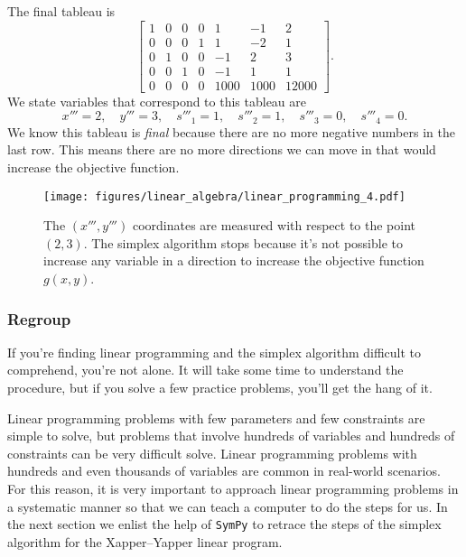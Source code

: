 \documentclass[11pt,oneside]{article}
\begin{document}
		\noindent
		The final tableau is
		\[
		\left[
		\begin{array}{rrrrrr|r}
		1& 0& 0& 0&    1&   -1&     2      \\ 
		0& 0& 0& 1&    1&   -2&     1      \\ 
		0& 1& 0& 0&   -1&    2&     3      \\ 
		0& 0& 1& 0&   -1&    1&     1      \\ 
		0& 0& 0& 0& 1000& 1000& 12000      
		\end{array}
		\right].
		\]
		We state variables that correspond to this tableau are
		\[
			x'''=2, \quad y'''=3, \quad s'''_1=1, \quad s'''_2=1,  \quad s'''_3=0, \quad s'''_4=0.
		\]	
		We know this tableau is \emph{final} because there are no more negative numbers in the last row.
		This means there are no more directions we can move in that would increase the objective function.

		\begin{figure}[htb]
		\begin{center}
		\texttt{[image: figures/linear\_algebra/linear\_programming\_4.pdf]}
		\end{center}
		\vspace{-3mm}
		\caption{The $(x''',y''')$ coordinates are measured with respect to the point $(2,3)$. 
				The simplex algorithm stops because it's not possible to increase any variable 
				in a direction to increase the objective function $g(x,y)$.}
		\label{fig:linear_programming_4}
		\end{figure}
		


	\subsubsection{Regroup}

		If you're finding linear programming and the simplex algorithm difficult to comprehend,
		you're not alone. 
		It will take some time to understand the procedure,
		but if you solve a few practice problems, you'll get the hang of it.
			
		Linear programming problems with few parameters and few constraints are simple to solve, 
		but problems that involve hundreds of variables and hundreds of constraints can be very difficult solve.
		Linear programming problems with hundreds and even thousands of variables are common in real-world scenarios.
		For this reason, it is very important to approach linear programming problems 
		in a systematic manner so that we can teach a computer to do the steps for us.
		In the next section we enlist the help of \texttt{SymPy} to retrace the steps of the simplex algorithm for the Xapper--Yapper linear program.
				
\end{document}
